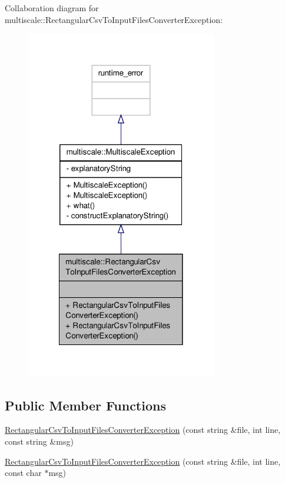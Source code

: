 Collaboration diagram for multiscale\-:\-:Rectangular\-Csv\-To\-Input\-Files\-Converter\-Exception\-:\nopagebreak
\begin{figure}[H]
\begin{center}
\leavevmode
\includegraphics[width=236pt]{classmultiscale_1_1RectangularCsvToInputFilesConverterException__coll__graph}
\end{center}
\end{figure}
\subsection*{Public Member Functions}
\begin{DoxyCompactItemize}
\item 
\hyperlink{classmultiscale_1_1RectangularCsvToInputFilesConverterException_aceecb7819828a8c5855ec4ae33ea8000}{Rectangular\-Csv\-To\-Input\-Files\-Converter\-Exception} (const string \&file, int line, const string \&msg)
\item 
\hyperlink{classmultiscale_1_1RectangularCsvToInputFilesConverterException_ada0b0ebc1c28661e6c90a37c6d8c3302}{Rectangular\-Csv\-To\-Input\-Files\-Converter\-Exception} (const string \&file, int line, const char $\ast$msg)
\end{DoxyCompactItemize}


